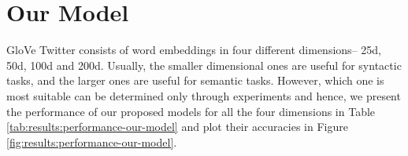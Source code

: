 \section{Our Model}
\label{sec:results:our-model}

\ac{GloVe} Twitter consists of word embeddings in four different dimensions-- 25d, 50d, 100d and 200d. Usually, the smaller dimensional ones are useful for syntactic tasks, and the larger ones are useful for semantic tasks. However, which one is most suitable can be determined only through experiments and hence, we present the performance of our proposed models for all the four dimensions in Table \ref{tab:results:performance-our-model} and plot their accuracies in Figure \ref{fig:results:performance-our-model}.

